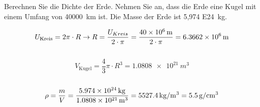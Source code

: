 
\begin{aufgabe}
Berechnen Sie die Dichte der Erde. Nehmen Sie an, dass die Erde eine Kugel mit einem Umfang von \SI{40000}{km} ist.
Die Masse der Erde ist \SI{5,974 E24}{kg}.
\begin{loesung}
\[U_{\text{Kreis}} = 2\pi \cdot R \to R=\frac{U_{Kreis}}{2\cdot\pi}=\frac{\SI{40E6}{m}}{2\cdot\pi}=\SI{6.3662e+6}{m}\]\\
\[V_{\text{Kugel}}= \frac{4}{3}\pi\cdot R^3 = \SI{1.0808e+21}{m^3}\]\\
\[\rho = \frac{m}{V} = \frac{\SI{5.974 E24}{kg}}{\SI{1.0808e+21}{m^3}}=\SI{5527.4}{kg/m^3}=\SI{5.5}{g/cm^3}\]
\end{loesung}
\end{aufgabe}
